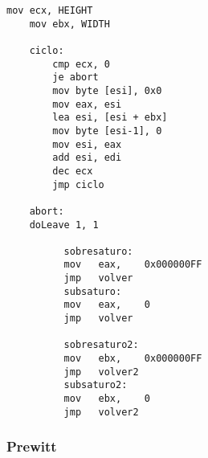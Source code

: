 \documentclass[11pt]{article}
\begin{document}
\begin{enumerate}
\begin{lstlisting}[frame=single]
	mov ecx, HEIGHT
	mov ebx, WIDTH
	
	ciclo:
		cmp ecx, 0
		je abort
		mov byte [esi], 0x0
		mov eax, esi
		lea esi, [esi + ebx]
		mov byte [esi-1], 0
		mov esi, eax
		add esi, edi
		dec ecx
		jmp ciclo

	abort:
	doLeave 1, 1

	      sobresaturo:
	      mov	eax,	0x000000FF
	      jmp	volver
	      subsaturo:
	      mov	eax,	0
	      jmp	volver

	      sobresaturo2:
	      mov	ebx,	0x000000FF
	      jmp	volver2
	      subsaturo2:
	      mov	ebx,	0
	      jmp	volver2
\end{lstlisting}
\end{enumerate}

\subsubsection{Prewitt} 
\end{document}
